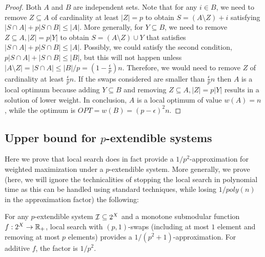 \begin{proof}
Both $A$ and $B$ are independent sets. 
Note that for any $i \in B$, we need to remove $Z \subseteq A$ of cardinality at least $|Z| = p$ to obtain $S = (A \setminus Z) + i$ satisfying $|S \cap A| + p|S \cap B| \leq |A|$. More generally, for $Y \subseteq B$, we need to remove $Z \subseteq A, |Z| = p|Y|$ to obtain $S = (A \setminus Z) \cup Y$ that satisfies $|S \cap A| + p|S \cap B| \leq |A|$. Possibly, we could satisfy the second condition, $p|S \cap A| + |S \cap B| \leq |B|$, but this will not happen unless $|A \setminus Z| = |S \cap A| \leq |B| / p = (1 - \frac{\epsilon}{p}) n$. Therefore, we would need to remove $Z$ of cardinality at least $\frac{\epsilon}{p} n$. If the swaps considered are smaller than $\frac{\epsilon}{p} n$ then $A$ is a local optimum because adding $Y \subseteq B$ and removing $Z \subseteq A, |Z| = p |Y|$ results in a solution of lower weight. In conclusion, $A$ is a local optimum of value $w(A) = n$, while the optimum is $OPT = w(B) = (p-\epsilon)^2 n$.
\end{proof}


\subsection{Upper bound for $p$-extendible systems}

Here we prove that local search does in fact provide a $1/p^2$-approximation for weighted maximization under a $p$-extendible system. More generally, we prove (here, we will ignore the technicalities of stopping the local search in polynomial time as this can be handled using standard techniques, while losing $1/poly(n)$ in the approximation factor) the following: 



\begin{theorem} \label{th:LS-approx}
For any $p$-extendible system $\mathcal{I} \subseteq 2^X$ and a monotone submodular function $f:2^X \rightarrow \mathbb{R}_+$,
local search with $(p,1)$-swaps (including at most $1$ element and removing at most $p$ elements) provides a $1/(p^2+1)$-approximation. For additive $f$, the factor is $1/p^2$.
\end{theorem}



